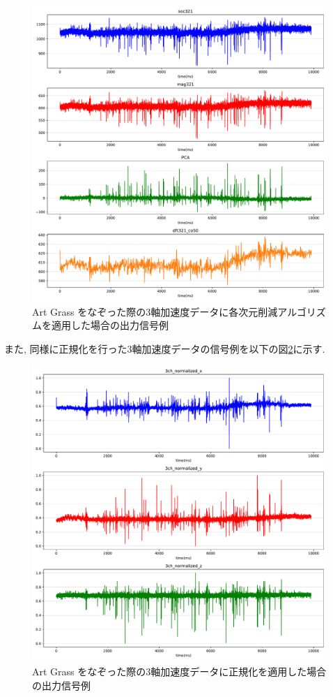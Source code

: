 \begin{figure}[H]
    \begin{center}
    \includegraphics[width=12cm]{eps/1ch_4.pdf}
    \caption{Art Grass をなぞった際の3軸加速度データに各次元削減アルゴリズムを適用した場合の出力信号例}
    \label{fig:prepros}
   \end{center}
   \end{figure}
   
また, 同様に正規化を行った3軸加速度データの信号例を以下の図\ref{fig:normalize}に示す. 

\begin{figure}[H]
    \begin{center}
    \includegraphics[width=12cm]{eps/3ch_normalized.pdf}
    \caption{Art Grass をなぞった際の3軸加速度データに正規化を適用した場合の出力信号例}
    \label{fig:normalize}
   \end{center}
   \end{figure}
   


